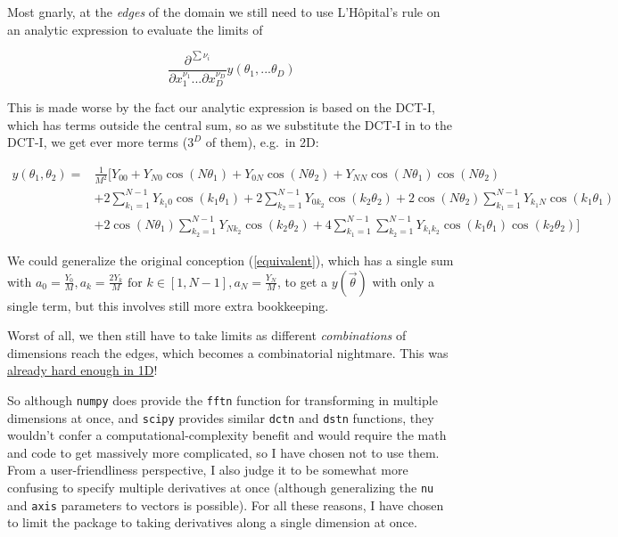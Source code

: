 \documentclass[10pt]{article}
\begin{document}
Most gnarly, at the \textit{edges} of the domain we still need to use L'Hôpital's rule on an analytic expression to evaluate the limits of

$$\frac{\partial^{\sum\nu_i}}{\partial x_1^{\nu_1} ... \partial x_D^{\nu_D}} y(\theta_1, ... \theta_D)$$

This is made worse by the fact our analytic expression is based on the DCT-I, which has terms outside the central sum, so as we substitute the DCT-I in to the DCT-I, we get ever more terms ($3^D$ of them), e.g.~in 2D:

\begin{align*}
y(\theta_1, \theta_2) =& \frac{1}{M^2} \Big[ Y_{00} + Y_{N0}\cos(N\theta_1) + Y_{0N}\cos(N\theta_2) + Y_{NN}\cos(N\theta_1)\cos(N\theta_2)\\
&+ 2\sum_{k_1 = 1}^{N-1} Y_{k_1 0} \cos(k_1 \theta_1) + 2\sum_{k_2 = 1}^{N-1} Y_{0 k_2} \cos(k_2 \theta_2) + 2\cos(N\theta_2) \sum_{k_1 = 1}^{N-1} Y_{k_1 N} \cos(k_1 \theta_1)\\
&+ 2\cos(N\theta_1) \sum_{k_2 = 1}^{N-1} Y_{N k_2} \cos(k_2 \theta_2) + 4 \sum_{k_1 = 1}^{N-1} \sum_{k_2 = 1}^{N-1} Y_{k_1 k_2} \cos(k_1 \theta_1) \cos(k_2 \theta_2)\Big]
\end{align*}

We could generalize the original conception (\autoref{equivalent}), which has a single sum with $a_0 = \frac{Y_0}{M}, a_k = \frac{2 Y_k}{M} \text{ for } k \in [1, N-1], a_N = \frac{Y_N}{M}$, to get a $y(\vec{\theta})$ with only a single term, but this involves still more extra bookkeeping.

Worst of all, we then still have to take limits as different \textit{combinations} of dimensions reach the edges, which becomes a combinatorial nightmare. This was \hyperref[endpoints]{already hard enough in 1D}!

So although \texttt{numpy} does provide the \texttt{fftn} function for transforming in multiple dimensions at once, and \texttt{scipy} provides similar \texttt{dctn} and \texttt{dstn} functions, they wouldn't confer a computational-complexity benefit and would require the math and code to get massively more complicated, so I have chosen not to use them. From a user-friendliness perspective, I also judge it to be somewhat more confusing to specify multiple derivatives at once (although generalizing the \texttt{nu} and \texttt{axis} parameters to vectors is possible). For all these reasons, I have chosen to limit the package to taking derivatives along a single dimension at once.
\end{document}
